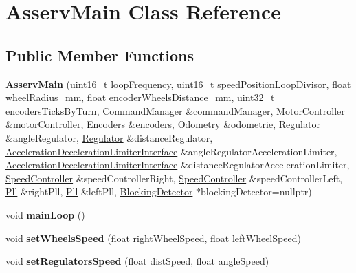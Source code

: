 \hypertarget{classAsservMain}{}\section{Asserv\+Main Class Reference}
\label{classAsservMain}
\subsection*{Public Member Functions}
\begin{DoxyCompactItemize}
\item 
\mbox{\label{classAsservMain_a757682a5588c799939cbe9baf3ea0069}} 
{\bfseries Asserv\+Main} (uint16\+\_\+t loop\+Frequency, uint16\+\_\+t speed\+Position\+Loop\+Divisor, float wheel\+Radius\+\_\+mm, float encoder\+Wheels\+Distance\+\_\+mm, uint32\+\_\+t encoders\+Ticks\+By\+Turn, \hyperlink{classCommandManager}{Command\+Manager} \&command\+Manager, \hyperlink{classMotorController}{Motor\+Controller} \&motor\+Controller, \hyperlink{classEncoders}{Encoders} \&encoders, \hyperlink{classOdometry}{Odometry} \&odometrie, \hyperlink{classRegulator}{Regulator} \&angle\+Regulator, \hyperlink{classRegulator}{Regulator} \&distance\+Regulator, \hyperlink{classAccelerationDecelerationLimiterInterface}{Acceleration\+Deceleration\+Limiter\+Interface} \&angle\+Regulator\+Acceleration\+Limiter, \hyperlink{classAccelerationDecelerationLimiterInterface}{Acceleration\+Deceleration\+Limiter\+Interface} \&distance\+Regulator\+Acceleration\+Limiter, \hyperlink{classSpeedController}{Speed\+Controller} \&speed\+Controller\+Right, \hyperlink{classSpeedController}{Speed\+Controller} \&speed\+Controller\+Left, \hyperlink{classPll}{Pll} \&right\+Pll, \hyperlink{classPll}{Pll} \&left\+Pll, \hyperlink{classBlockingDetector}{Blocking\+Detector} $\ast$blocking\+Detector=nullptr)
\item 
\mbox{\label{classAsservMain_a41ef8d5926e980b78784a74be1d02576}} 
void {\bfseries main\+Loop} ()
\item 
\mbox{\label{classAsservMain_adc671b6c508bfc851207a93d00f163cd}} 
void {\bfseries set\+Wheels\+Speed} (float right\+Wheel\+Speed, float left\+Wheel\+Speed)
\item 
\mbox{\label{classAsservMain_a3880d75375a1fe2102fce15368bfadc0}} 
void {\bfseries set\+Regulators\+Speed} (float dist\+Speed, float angle\+Speed)

\end{DoxyCompactItemize}

